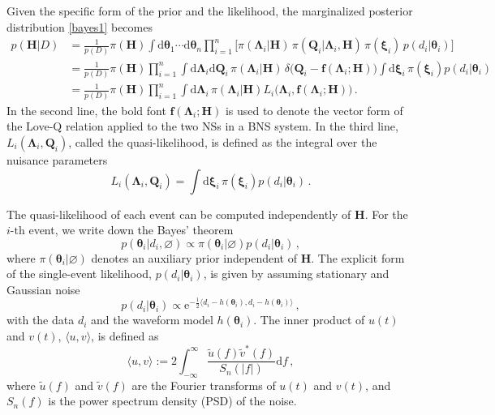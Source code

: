 \documentclass[a4paper,11pt]{article}
\begin{document}
Given the specific form of the prior and the likelihood, the marginalized
posterior distribution \eqref{bayes1} becomes
\begin{equation}
\label{hierarchical bayes}
\begin{aligned}
p(\bm{H}|D) &= \frac{1}{p(D)}\pi(\bm{H}) \int \text{d}\bm{\theta}_1
\cdots\text{d} \bm{\theta}_n \prod_{i=1}^n \big[\pi(\bm{\Lambda}_i|
\bm{H}) \, \pi(\bm{Q}_i| \bm{\Lambda}_i,
\bm{H}) \,\pi(\bm{\xi}_i) \,p(d_i|\bm{\theta}_i)\big] \\
&=\frac{1}{p(D)} \pi(\bm{H}) \prod_{i=1}^n \int \text{d}\bm{\Lambda}_i
\text{d}\bm{Q}_i \,\pi (\bm{\Lambda}_i|\bm{H}) \, \delta\big(\bm{Q}_i -
\bm{f}(\bm{\Lambda}_i; \bm{H})\big) \int \text{d} \bm{\xi}_i \,
\pi(\bm{\xi}_i)p(d_i|\bm{\theta}_i)\\
&=\frac{1}{p(D)} \pi(\bm{H}) \prod_{i=1}^n \int \text{d}\bm{\Lambda}_i \,
\pi(\bm{\Lambda}_i| \bm{H})L_i\big( \bm{\Lambda}_i,
\bm{f}(\bm{\Lambda}_i;\bm{H})\big)\,.
\end{aligned}
\end{equation}
In the second line, the bold font $\bm{f}(\bm{\Lambda}_i;\bm{H})$ is used to
denote the vector form of the Love-Q relation applied to the two NSs in a BNS
system. In the third line, $L_i(\bm{\Lambda}_i,\bm{Q}_i)$, called the
quasi-likelihood, is defined as the integral over the nuisance parameters
\begin{equation}
\label{quasi-likelihood}
    L_i(\bm{\Lambda}_i,\bm{Q}_i) =\int \text{d}\bm{\xi}_i \,
    \pi(\bm{\xi}_i)p(d_i|\bm{\theta}_i)\,.
\end{equation}

The quasi-likelihood of each event can be computed independently of $\bm{H}$.
For the $i\text{-th}$ event, we write down the Bayes' theorem
\begin{equation}
\label{single bayes}
    p(\bm{\theta}_i|d_i, \varnothing)\propto
    \pi(\bm{\theta}_i|\varnothing)p(d_i|\bm{\theta}_i)\,,
\end{equation}
where $\pi(\bm{\theta}_i|\varnothing)$ denotes an auxiliary prior independent of
$\bm{H}$.  The explicit form of the single-event likelihood,
$p(d_i|\bm{\theta}_i)$, is given by assuming stationary and Gaussian
noise~\cite{Finn:1992wt}
\begin{equation}
p(d_i|\bm{\theta}_i)\propto \mathrm{e}^{ -\frac{1}{2} \langle
d_i-h(\bm{\theta}_i),d_i-h(\bm{\theta}_i)\rangle}\,,
\end{equation}
with the data $d_i$ and the waveform model $h(\bm{\theta}_i)$.  The inner
product of $u(t)$ and $v(t)$, $\langle u, v\rangle$, is defined as
\begin{equation}
    \langle u, v\rangle:= 2\int_{-\infty}^{\infty} \frac{\tilde{u}(f)
    \tilde{v}^{*}(f)}{S_n(|f|)} \text{d}f\,,
\end{equation}
where $\tilde{u}(f)$ and $\tilde{v}(f)$ are the Fourier transforms of $u(t)$ and
$v(t)$, and $S_n(f)$ is the power spectrum density (PSD) of the noise.
\end{document}
